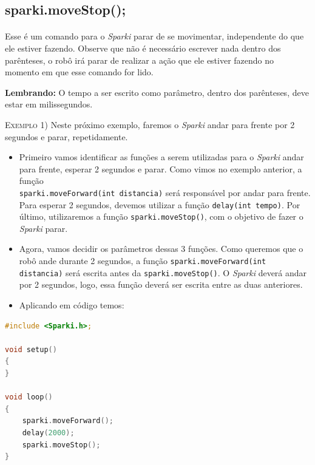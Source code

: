 \subsection{sparki.moveStop();}
    \paragraph{}
    Esse é um comando para o \textsl{Sparki} parar de se movimentar, independente do que ele estiver fazendo. Observe que não é necessário escrever nada dentro dos parênteses, o robô irá parar de realizar a ação que ele estiver fazendo no momento em que esse comando for lido.
    
    \begin{center}
        \textcolor{mydarkblue!80!black}{\textbf{Lembrando:}} O tempo a ser escrito como parâmetro, dentro dos parênteses, deve estar em milissegundos.
    \end{center}
    
    \textsc{Exemplo 1)} Neste próximo exemplo, faremos o \textsl{Sparki} andar para frente por 2 segundos e parar, repetidamente.
    
    \begin{itemize}
        \item Primeiro vamos identificar as funções a serem utilizadas para o \textsl{Sparki} andar para frente, esperar 2 segundos e parar. Como vimos no exemplo anterior, a função \\ \lstinline[columns=fixed]{sparki.moveForward(int distancia)} será responsável por andar para frente. Para esperar 2 segundos, devemos utilizar a função \lstinline[columns=fixed]{delay(int tempo)}. Por último, utilizaremos a função \lstinline[columns=fixed]{sparki.moveStop()}, com o objetivo de fazer o \textsl{Sparki} parar.
        \item Agora, vamos decidir os parâmetros dessas 3 funções. Como queremos que o robô ande durante 2 segundos, a função \lstinline[columns=fixed]{sparki.moveForward(int distancia)} será escrita antes da \lstinline[columns=fixed]{sparki.moveStop()}. O \textsl{Sparki} deverá andar por 2 segundos, logo, essa função deverá ser escrita entre as duas anteriores.
        \item Aplicando em código temos:
    \end{itemize}
    
    \begin{lstlisting}[language=C]
#include <Sparki.h>;

void setup()
{
}

void loop()
{
    sparki.moveForward();
    delay(2000);
    sparki.moveStop();
}
\end{lstlisting}
    
